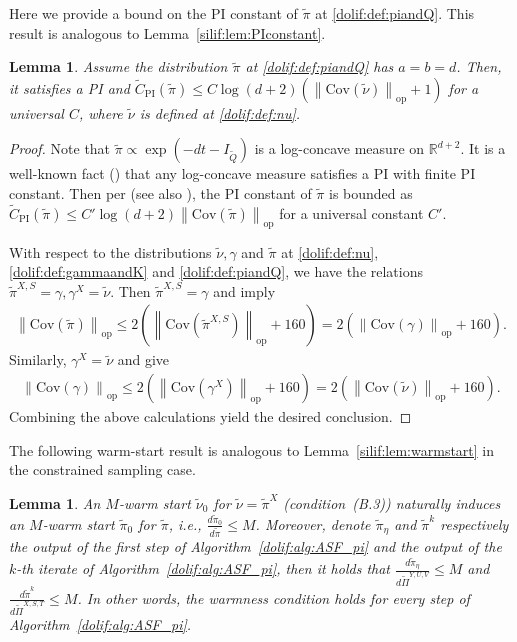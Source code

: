 \documentclass[11pt,letterpaper]{article}
\newcommand{\R}{\mathbb{R}}
\newcommand{\norm}[1]{\left\lVert #1 \right\rVert}
\newcommand{\cov}[1]{\mathrm{Cov}{\left( #1\right)}}
\newcommand{\Q}{\widetilde{Q}}
\newcommand{\opnorm}[1]{\norm{#1}_{\operatorname{op}}}
\newcommand{\brac}[1]{\left( #1\right)}
\newtheorem{lemma}[thm]{Lemma}
\begin{document}
Here we provide a bound on the PI constant of $\tilde{\pi}$ at \eqref{dolif:def:piandQ}. 
This result is analogous to Lemma~\ref{silif:lem:PIconstant}.

\begin{lemma}
\label{dolif:lem:PIconstant}
    Assume the distribution $\tilde{\pi}$ at \eqref{dolif:def:piandQ} has $a=b=d$. Then, it satisfies a PI and $  \widetilde{C}_{\mathrm{PI}}(\tilde{\pi})\leq C\log (d+2)\brac{\opnorm{\cov{\tilde{\nu}}}+1 }$ for a universal $C$, where $\tilde{\nu}$ is defined at \eqref{dolif:def:nu}. 
\end{lemma}


\begin{proof}   
Note that $\tilde{\pi}\propto \exp\brac{-dt-I_{\Q}}$ is a log-concave measure on $\R^{d+2}$. It is a well-known fact (\cite{kannan1995isoperimetric,bobkov1999isoperimetric}) that any log-concave measure satisfies a PI with finite PI constant. Then per \cite[Remark 7.12]{klartag2025lecturenoteisoperimetric} (see also \cite{klartag2023logarithmic}), the PI constant of $\tilde{\pi}$ is bounded as $ \widetilde{C}_{\mathrm{PI}}(\tilde{\pi})\leq C'\log (d+2) \opnorm{\cov{\tilde{\pi}}}$
for a universal constant $C'$. 

With respect to the distributions $\tilde{\nu},\gamma$ and $\tilde{\pi}$ at \eqref{dolif:def:nu}, \eqref{dolif:def:gammaandK} and \eqref{dolif:def:piandQ}, we have the relations $\tilde{\pi}^{X,S}=\gamma,\gamma^X=\tilde{\nu}$. Then $\tilde{\pi}^{X,S}=\gamma$ and \cite[Lemma 2.5]{kook2025algodiffusion} imply 
\begin{align*}
    \opnorm{\cov{\tilde{\pi}}}\leq 2\brac{\opnorm{\cov{\tilde{\pi}^{X,S}}}+160 }= 2\brac{\opnorm{\cov{\gamma}}+160 }.
\end{align*}
Similarly, $\gamma^X=\tilde{\nu}$ and \cite[Lemma 2.5]{kook2025algodiffusion} give 
\begin{align*}
    \opnorm{\cov{\gamma}}\leq 2\brac{\opnorm{\cov{\gamma^{X}}}+160 }= 2\brac{\opnorm{\cov{\tilde{\nu}}}+160 }.
\end{align*}
Combining the above calculations yield the desired conclusion. 
\end{proof}


The following warm-start result is analogous to Lemma~\ref{silif:lem:warmstart} in the constrained sampling case.
\begin{lemma}
\label{dolif:lem:warmstart}
    An $M$-warm start $\tilde{\nu}_0$ for $\tilde{\nu}=\tilde{\pi}^X$ (condition~(B.3)) naturally induces an $M$-warm start $\tilde{\pi}_0$ for $\tilde{\pi}$, i.e., $\frac{d\tilde{\pi}_0}{d\tilde{\pi}}\leq M$. Moreover, denote $\tilde{\pi}_\eta$ and $\tilde{\pi}^k$ respectively the output of the first step of Algorithm~\ref{dolif:alg:ASF_pi} and the output of the $k$-th iterate of Algorithm~\ref{dolif:alg:ASF_pi}, then it holds that $    \frac{d\tilde{\pi}_\eta}{d\widetilde{\Pi}^{Y,U,V}}\leq M$ and $\frac{d\tilde{\pi}^k}{d\widetilde{\Pi}^{X,S,T}}\leq M$. In other words, the warmness condition holds for every step of Algorithm~\ref{dolif:alg:ASF_pi}. 
\end{lemma}
\end{document}
